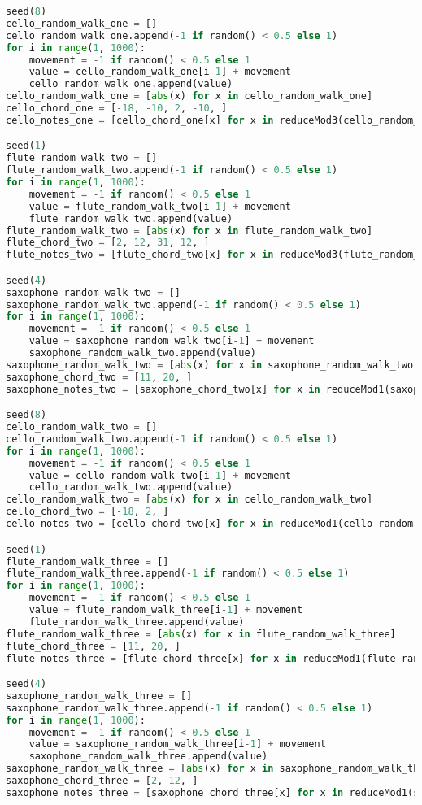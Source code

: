 \begin{lstlisting}[language=Python, caption=Four Ages of Sand Segment\_III]
seed(8)
cello_random_walk_one = []
cello_random_walk_one.append(-1 if random() < 0.5 else 1)
for i in range(1, 1000):
    movement = -1 if random() < 0.5 else 1
    value = cello_random_walk_one[i-1] + movement
    cello_random_walk_one.append(value)
cello_random_walk_one = [abs(x) for x in cello_random_walk_one]
cello_chord_one = [-18, -10, 2, -10, ]
cello_notes_one = [cello_chord_one[x] for x in reduceMod3(cello_random_walk_one)]

seed(1)
flute_random_walk_two = []
flute_random_walk_two.append(-1 if random() < 0.5 else 1)
for i in range(1, 1000):
    movement = -1 if random() < 0.5 else 1
    value = flute_random_walk_two[i-1] + movement
    flute_random_walk_two.append(value)
flute_random_walk_two = [abs(x) for x in flute_random_walk_two]
flute_chord_two = [2, 12, 31, 12, ]
flute_notes_two = [flute_chord_two[x] for x in reduceMod3(flute_random_walk_two)]

seed(4)
saxophone_random_walk_two = []
saxophone_random_walk_two.append(-1 if random() < 0.5 else 1)
for i in range(1, 1000):
    movement = -1 if random() < 0.5 else 1
    value = saxophone_random_walk_two[i-1] + movement
    saxophone_random_walk_two.append(value)
saxophone_random_walk_two = [abs(x) for x in saxophone_random_walk_two]
saxophone_chord_two = [11, 20, ]
saxophone_notes_two = [saxophone_chord_two[x] for x in reduceMod1(saxophone_random_walk_two)]

seed(8)
cello_random_walk_two = []
cello_random_walk_two.append(-1 if random() < 0.5 else 1)
for i in range(1, 1000):
    movement = -1 if random() < 0.5 else 1
    value = cello_random_walk_two[i-1] + movement
    cello_random_walk_two.append(value)
cello_random_walk_two = [abs(x) for x in cello_random_walk_two]
cello_chord_two = [-18, 2, ]
cello_notes_two = [cello_chord_two[x] for x in reduceMod1(cello_random_walk_two)]

seed(1)
flute_random_walk_three = []
flute_random_walk_three.append(-1 if random() < 0.5 else 1)
for i in range(1, 1000):
    movement = -1 if random() < 0.5 else 1
    value = flute_random_walk_three[i-1] + movement
    flute_random_walk_three.append(value)
flute_random_walk_three = [abs(x) for x in flute_random_walk_three]
flute_chord_three = [11, 20, ]
flute_notes_three = [flute_chord_three[x] for x in reduceMod1(flute_random_walk_three)]

seed(4)
saxophone_random_walk_three = []
saxophone_random_walk_three.append(-1 if random() < 0.5 else 1)
for i in range(1, 1000):
    movement = -1 if random() < 0.5 else 1
    value = saxophone_random_walk_three[i-1] + movement
    saxophone_random_walk_three.append(value)
saxophone_random_walk_three = [abs(x) for x in saxophone_random_walk_three]
saxophone_chord_three = [2, 12, ]
saxophone_notes_three = [saxophone_chord_three[x] for x in reduceMod1(saxophone_random_walk_three)]


\end{lstlisting}
